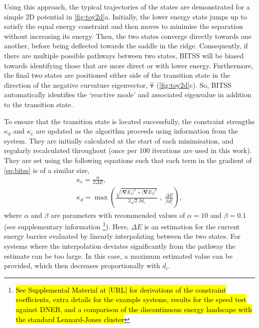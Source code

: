 \documentclass[aps,prl,twocolumn,10pt,groupedaddress]{revtex4-2}
\begin{document}
Using this approach, the typical trajectories of the states are demonstrated for a simple 2D potential in \cref{fig:toy2d}a.
Initially, the lower energy state jumps up to satisfy the equal energy constraint and then moves to minimise the separation without increasing its energy.
Then, the two states converge directly towards one another, before being deflected towards the saddle in the ridge.
Consequently, if there are multiple possible pathways between two states, BITSS will be biased towards identifying those that are more direct or with lower energy.
Furthermore, the final two states are positioned either side of the transition state in the direction of the negative curvature eigenvector, $\bm{\hat{\tau}}$ (\cref{fig:toy2d}c).
So, BITSS automatically identifies the `reactive mode' and associated eigenvalue in addition to the transition state.

To ensure that the transition state is located successfully, the constraint strengths $\kappa_d$ and $\kappa_e$ are updated as the algorithm proceeds using information from the system.
They are initially calculated at the start of each minimisation, and regularly recalculated throughout (once per 100 iterations are used in this work).
They are set using the following equations such that each term in the gradient of \cref{eq:bitss} is of a similar size,
\begin{gather}
  \kappa_e = \frac {\alpha} {2 \Delta E},
  \label{eq:ke}
  \\
  \kappa_d = \max \left(
    \frac {\sqrt{|\bm{\nabla} E_1|^2 + |\bm{\nabla} E_2|^2}} {2\sqrt{2} \beta d_i} \; , \;
    \frac{\Delta E}{\beta d_i^2} \right),
  \label{eq:kd}
\end{gather}
where $\alpha$ and $\beta$ are parameters with recommended values of $\alpha = 10$ and $\beta = 0.1$ (see supplementary information \footnote{\hl{See Supplemental Material at [URL] for derivations of the constraint coefficients, extra details for the example systems, results for the speed test against DNEB, and a comparison of the discontinuous energy landscape with the standard Lennard-Jones cluster}}).
Here, $\Delta E$ is an estimation for the current energy barrier evaluated by linearly interpolating between the two states.
For systems where the interpolation deviates significantly from the pathway the estimate can be too large.
In this case, a maximum estimated value can be provided, which then decreases proportionally with $d_i$.
\end{document}
